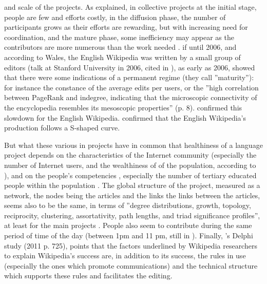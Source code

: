 and scale of the projects. As \citet{MarwellOliver93,OliverMarwellTeixeira85}
explained, in collective projects at the initial stage, people are
few and efforts costly, in the diffusion phase, the number of participants
grows as their efforts are rewarding, but with increasing need for
coordination, and the mature phase, some inefficiency may appear as
the contributors are more numerous than the work needed \citep[note that this has been empirically tested in the case of open online communities by][]{Alluvattietal11}.
if until 2006, and according to Wales, the English Wikipedia was written
by a small group of editors (talk at Stanford University in 2006,
cited in \citealp{Swartz06}), as early as 2006, \citet{Burioletal06}
showed that there were some indications of a permanent regime (they
call ''maturity''): for instance the constance of the average edits
per users, or the ''high correlation between PageRank and indegree,
indicating that the microscopic connectivity of the encyclopedia resembles
its mesoscopic properties'' (p. 8). \citet{Suhetal09} confirmed
this slowdown for the English Wikipedia. \citet{LamRiedl11} confirmed
that the English Wikipedia's production follows a S-shaped curve.

But what these various in projects have in common that healthiness
of a language project depends on the characteristics of the Internet
community (especially the number of Internet users, and the wealthiness
of of the population, according to \citealp{Rask08}), and on the
people's competencies \citep{GlottSchmidtGhosh10}, especially the
number of tertiary educated people within the population \citep{CrowstonJullienOrtega13}.
The global structure of the project, measured as a network, the nodes
being the articles and the links the links between the articles, seems
also to be the same, in terms of ''degree distributions, growth,
topology, reciprocity, clustering, assortativity, path lengths, and
triad significance profiles'', at least for the main projects \citep{Zlaticetat06}.
People also seem to contribute during the same period of time of the
day (between 1pm and 11 pm, still in \citealp{YasseriSumiKertesz12}).
Finally, \citeauthor{ZhaoBishop11}'s Delphi study (2011 p. 725),
points that the factors underlined by Wikipedia researchers to explain
Wikipedia's success are, in addition to its success, the rules in
use (especially the ones which promote communications) and the technical
structure which supports these rules and facilitates the editing.


